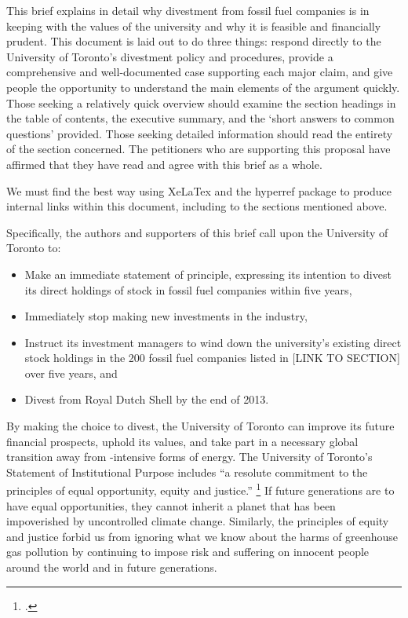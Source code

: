 This brief explains in detail why divestment from fossil fuel companies is in keeping with the values of the university and why it is feasible and financially prudent.
This document is laid out to do three things: respond directly to the University of Toronto's divestment policy and procedures, provide a comprehensive and well-documented case supporting each major claim, and give people the opportunity to understand the main elements of the argument quickly.
Those seeking a relatively quick overview should examine the section headings in the table of contents, the executive summary, and the `short answers to common questions' provided.
Those seeking detailed information should read the entirety of the section concerned.
The petitioners who are supporting this proposal have affirmed that they have read and agree with this brief as a whole.



\begin{vcom}
We must find the best way using XeLaTex and the hyperref package to produce internal links within this document, including to the sections mentioned above.
\end{vcom}


Specifically, the authors and supporters of this brief call upon the University of Toronto to:
\begin{itemize}
	\item Make an immediate statement of principle, expressing its intention to divest its direct holdings of stock in fossil fuel companies within five years,
	\item Immediately stop making new investments in the industry,
	\item Instruct its investment managers to wind down the university’s existing direct stock holdings in the 200 fossil fuel companies listed in [LINK TO SECTION] over five years, and
	\item Divest from Royal Dutch Shell by the end of 2013.
\end{itemize}



By making the choice to divest, the University of Toronto can improve its future financial prospects, uphold its values, and take part in a necessary global transition away from -intensive forms of energy.
The University of Toronto's Statement of Institutional Purpose includes ``a resolute commitment to the principles of equal opportunity, equity and justice.'' \footcite{InstitutionalPurpose}
If future generations are to have equal opportunities, they cannot inherit a planet that has been impoverished by uncontrolled climate change.
Similarly, the principles of equity and justice forbid us from ignoring what we know about the harms of greenhouse gas pollution by continuing to impose risk and suffering on innocent people around the world and in future generations.



